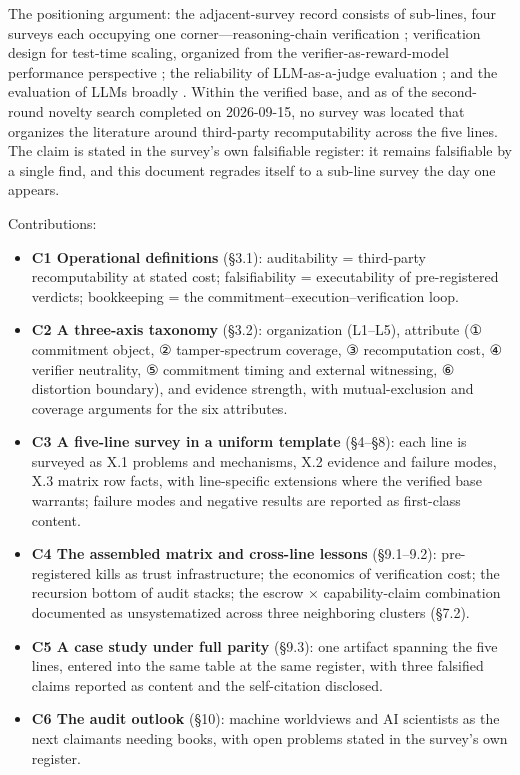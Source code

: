 \documentclass[11pt,a4paper]{article}
\begin{document}
The positioning argument: the adjacent-survey record consists of sub-lines, four surveys each occupying one corner—reasoning-chain verification \cite{key14}; verification design for test-time scaling, organized from the verifier-as-reward-model performance perspective \cite{key15}; the reliability of LLM-as-a-judge evaluation \cite{key16}; and the evaluation of LLMs broadly \cite{key17}. Within the verified base, and as of the second-round novelty search completed on 2026-09-15, no survey was located that organizes the literature around third-party recomputability across the five lines. The claim is stated in the survey's own falsifiable register: it remains falsifiable by a single find, and this document regrades itself to a sub-line survey the day one appears.

Contributions:

\begin{itemize}[leftmargin=1.6em]
\item \textbf{C1 Operational definitions} (§3.1): auditability = third-party recomputability at stated cost; falsifiability = executability of pre-registered verdicts; bookkeeping = the commitment–execution–verification loop.
\item \textbf{C2 A three-axis taxonomy} (§3.2): organization (L1–L5), attribute (① commitment object, ② tamper-spectrum coverage, ③ recomputation cost, ④ verifier neutrality, ⑤ commitment timing and external witnessing, ⑥ distortion boundary), and evidence strength, with mutual-exclusion and coverage arguments for the six attributes.
\item \textbf{C3 A five-line survey in a uniform template} (§4–§8): each line is surveyed as X.1 problems and mechanisms, X.2 evidence and failure modes, X.3 matrix row facts, with line-specific extensions where the verified base warrants; failure modes and negative results are reported as first-class content.
\item \textbf{C4 The assembled matrix and cross-line lessons} (§9.1–9.2): pre-registered kills as trust infrastructure; the economics of verification cost; the recursion bottom of audit stacks; the escrow × capability-claim combination documented as unsystematized across three neighboring clusters (§7.2).
\item \textbf{C5 A case study under full parity} (§9.3): one artifact spanning the five lines, entered into the same table at the same register, with three falsified claims reported as content and the self-citation disclosed.
\item \textbf{C6 The audit outlook} (§10): machine worldviews and AI scientists as the next claimants needing books, with open problems stated in the survey's own register.
\end{itemize}
\end{document}
